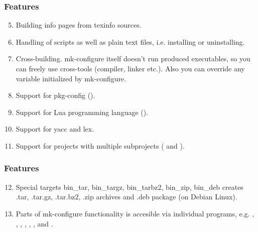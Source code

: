\documentclass[hyperref={colorlinks=true}]{beamer}
\begin{document}

\begin{frame}[fragile,t]
  \frametitle{Features}
  \begin{block}{}
  \begin{enumerate}
  \setcounter{enumi}{4}
  \item Building info pages from texinfo sources.
  \item Handling of scripts as well as plain text files,
    i.e. installing or uninstalling.
  \item Cross-building. mk-configure itself doesn't run produced
    executables, so you can freely use cross-tools (compiler, linker
    etc.).  Also you can override any variable initialized by mk-configure.
  \item Support for pkg-config
    ().
  \item Support for Lua programming language
    ().
  \item Support for yacc and lex.
  \item Support for projects with multiple subprojects
    ( and ).
  \end{enumerate}
  \end{block}
\end{frame}


\begin{frame}[fragile,t]
  \frametitle{Features}
  \begin{block}{}
  \begin{enumerate}
    \setcounter{enumi}{11}
    \item Special targets bin\_tar, bin\_targz, bin\_tarbz2, bin\_zip,
      bin\_deb creates .tar, .tar.gz, .tar.bz2, .zip archives and .deb
      package (on Debian Linux).
    \item Parts of mk-configure functionality is
      accesible via individual programs, e.g.  ,
      ,
      , ,
      ,
      ,  and
      .
  \end{enumerate}
  \end{block}
\end{frame}
\end{document}
